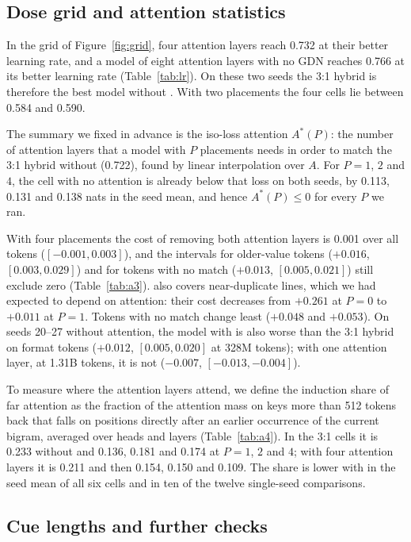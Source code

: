\subsection{Dose grid and attention statistics}
\label{app:grid}

In the grid of Figure~\ref{fig:grid}, four attention layers reach 0.732 at their better learning
rate, and a model of eight attention layers with no GDN reaches 0.766 at its better learning rate
(Table~\ref{tab:lr}). On these two seeds the 3:1 hybrid is therefore the best model without
\ingram{}. With two placements the four cells lie between 0.584 and 0.590.

The summary we fixed in advance is the iso-loss attention $A^{*}(P)$: the number of attention
layers that a model with $P$ placements needs in order to match the 3:1 hybrid without \ingram{}
(0.722), found by linear interpolation over $A$. For $P = 1$, $2$ and $4$, the cell with no
attention is already below that loss on both seeds, by 0.113, 0.131 and 0.138 nats in the seed
mean, and hence $A^{*}(P) \le 0$ for every $P$ we ran.

With four placements the cost of removing both attention layers is 0.001 over all tokens
($[-0.001, 0.003]$), and the intervals for older-value tokens ($+0.016$, $[0.003, 0.029]$) and for
tokens with no match ($+0.013$, $[0.005, 0.021]$) still exclude zero (Table~\ref{tab:a3}).
\ingram{} also covers near-duplicate lines, which we had expected to depend on attention: their
cost decreases from $+0.261$ at $P = 0$ to $+0.011$ at $P = 1$. Tokens with no match change least
($+0.048$ and $+0.053$). On seeds 20--27 without attention, the model with \ingram{} is also worse
than the 3:1 hybrid on format tokens ($+0.012$, $[0.005, 0.020]$ at 328M tokens); with one
attention layer, at 1.31B tokens, it is not ($-0.007$, $[-0.013, -0.004]$).

To measure where the attention layers attend, we define the induction share of far attention as
the fraction of the attention mass on keys more than 512 tokens back that falls on positions
directly after an earlier occurrence of the current bigram, averaged over heads and layers
(Table~\ref{tab:a4}). In the 3:1 cells it is 0.233 without \ingram{} and 0.136, 0.181 and 0.174 at
$P = 1$, $2$ and $4$; with four attention layers it is 0.211 and then 0.154, 0.150 and 0.109. The
share is lower with \ingram{} in the seed mean of all six cells and in ten of the twelve
single-seed comparisons.

\subsection{Cue lengths and further checks}
\label{sec:cues}

